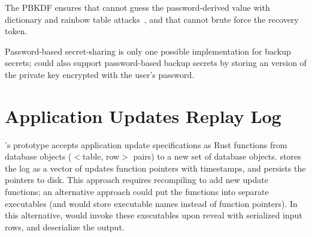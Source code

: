 The PBKDF ensures that \sys cannot guess the password-derived value with
dictionary and rainbow table attacks~\cite{pbkdf}, and that \sys cannot brute force
the recovery token.
%
%

%
%


%
Password-based secret-sharing is only one possible implementation for backup
secrets; \sys could also support password-based backup secrets by \eg storing an
version of the private key encrypted with the user's password.
%

\section{Application Updates Replay Log}

\sys's prototype accepts application update specifications as Rust functions from database objects
($<$table, row$>$ pairs) to a new set of database objects. \sys stores the log
as a vector of updates function pointers with timestamps, and persists the
pointers to disk. This approach requires recompiling \sys to add new update
functions; an alternative approach could put the functions into separate
executables (and \sys would store executable names instead of function
pointers). In this alternative, \sys would invoke these executables upon reveal
with serialized input rows, and deserialize the output.

